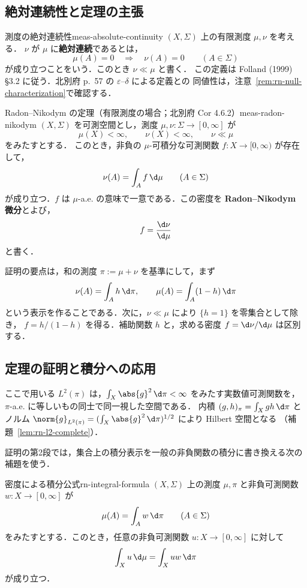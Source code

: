 \subsection{絶対連続性と定理の主張}

\begin{definition}{測度の絶対連続性}{meas-absolute-continuity}
  $(X,\Sigma)$ 上の有限測度 $\mu,\nu$ を考える．
  $\nu$ が $\mu$ に\textbf{絶対連続}であるとは，
  \[
    \mu(A)=0\quad\Longrightarrow\quad\nu(A)=0
    \qquad(A\in\Sigma)
  \]
  が成り立つことをいう．このとき $\nu\ll\mu$ と書く．
  この定義は Folland (1999) §3.2 に従う．北別府 p.~57 の $\varepsilon$--$\delta$ による定義との
  同値性は，注意~\ref{rem:rn-null-characterization}で確認する．
\end{definition}

\begin{theorem}{Radon--Nikodym の定理（有限測度の場合；北別府 Cor 4.6.2）}{meas-radon-nikodym}
  $(X,\Sigma)$ を可測空間とし，測度 $\mu,\nu\colon\Sigma\to[0,\infty]$ が
  \[
    \mu(X)<\infty,\qquad\nu(X)<\infty,\qquad\nu\ll\mu
  \]
  をみたすとする．
  このとき，非負の $\mu$-可積分な可測関数 $f\colon X\to[0,\infty)$ が存在して，
  \[
    \nu(A)=\int_Af\,\d\mu\qquad(A\in\Sigma)
  \]
  が成り立つ．$f$ は $\mu$-a.e. の意味で一意である．この密度を
  \textbf{Radon--Nikodym 微分}とよび，
  \[
    f=\frac{\d\nu}{\d\mu}
  \]
  と書く．
\end{theorem}

証明の要点は，和の測度 $\pi:=\mu+\nu$ を基準にして，まず
\[
  \nu(A)=\int_Ah\,\d\pi,\qquad
  \mu(A)=\int_A(1-h)\,\d\pi
\]
という表示を作ることである．次に，$\nu\ll\mu$ により $\{h=1\}$ を零集合として除き，
$f=h/(1-h)$ を得る．補助関数 $h$ と，求める密度 $f=\d\nu/\d\mu$ は区別する．

\subsection{定理の証明と積分への応用}

ここで用いる $L^2(\pi)$ は，$\int_X\abs{g}^2\,\d\pi<\infty$ をみたす実数値可測関数を，
$\pi$-a.e. に等しいもの同士で同一視した空間である．
内積 $(g,h)_\pi=\int_Xgh\,\d\pi$ とノルム
$\norm{g}_{L^2(\pi)}=(\int_X\abs{g}^2\,\d\pi)^{1/2}$ により Hilbert 空間となる
（補題~\ref{lem:rn-l2-complete}）．

証明の第2段では，集合上の積分表示を一般の非負関数の積分に書き換える次の補題を使う．

\begin{lemma}{密度による積分公式}{rn-integral-formula}
  $(X,\Sigma)$ 上の測度 $\mu,\pi$ と非負可測関数 $w\colon X\to[0,\infty]$ が
  \[
    \mu(A)=\int_Aw\,\d\pi\qquad(A\in\Sigma)
  \]
  をみたすとする．このとき，任意の非負可測関数 $u\colon X\to[0,\infty]$ に対して
  \[
    \int_Xu\,\d\mu=\int_Xuw\,\d\pi
  \]
  が成り立つ．
\end{lemma}

